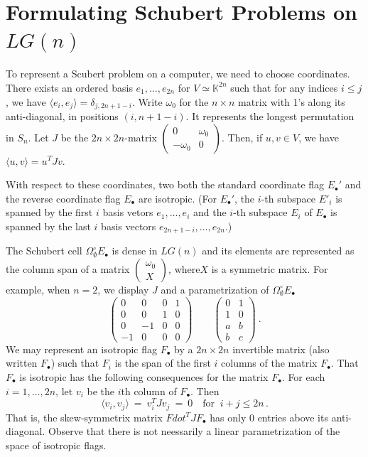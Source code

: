 \documentclass[12pt]{amsart}
\theoremstyle{remark}
\newcommand{\Fdot}{F_\bullet}
\newcommand{\Edot}{E_\bullet}
\newcommand{\LG}{\textit{LG}}
\newcommand{\KK}{{\mathbb K}}
\newcommand{\defcolor}[1]{{\color{blue}#1}}
\begin{document}
\section{Formulating Schubert Problems on $LG(n)$}

To represent a Scubert problem on a computer, we need to choose coordinates.
There exists an ordered basis  $e_1,\dotsc,e_{2n}$ for $V\simeq\KK^{2n}$ such that for any indices  $i\leq j$, we have 
$\langle e_i,e_j\rangle = \delta_{j, 2n+1-i}$.
Write \defcolor{$\omega_0$} for the $n\times n$ matrix with 1's along its anti-diagonal, in positions $(i,n{+}1{-}i)$.
It represents the longest permutation in $S_n$.
Let $J$ be the $2n\times 2n$-matrix $\left(\begin{smallmatrix}0&\omega_0\\-\omega_0&0\end{smallmatrix}\right)$.
Then, if $u,v\in V$, we have $\langle u,v\rangle = u^T J v$.

With respect to these coordinates, two both the standard coordinate flag $\Edot'$ and the reverse coordinate flag $\Edot$
are isotropic.
(For $\Edot'$, the $i$-th subspace $E'_i$ is spanned by the first $i$ basis vetors $e_1,\dotsc,e_i$ and
the  $i$-th subspace $E_i$ of $\Edot$ is spanned by the last $i$ basis vectors $e_{2n+1-i},\dotsc, e_{2n}$.)

The Schubert cell $\Omega^\circ_\emptyset \Edot$ is dense in $\LG(n)$ and its elements are represented as the column span of a matrix
$\left(\begin{smallmatrix}\omega_0\\X\end{smallmatrix}\right)$, where$X$ is a symmetric matrix.
For example, when $n=2$, we display $J$ and a parametrization of $\Omega^\circ_\emptyset \Edot$
\[
\left(\begin{matrix} 0& 0&0&1\\ 0& 0&1&0\\ 0&-1&0&0\\ -1& 0&0&0\end{matrix}\right)
  \qquad
  \left(\begin{matrix} 0&1\\ 1&0\\ a&b\\ b&c\end{matrix}\right)\ .
\]
We may represent an isotropic flag $\Fdot$ by a $2n\times 2n$ invertible matrix (also written $\Fdot$) such that $F_i$ is the span of
the first $i$ columns of the matrix $\Fdot$.
That $\Fdot$ is isotropic has the following consequences for the matrix $\Fdot$.
For each $i=1,\dotsc,2n$, let $v_i$ be the $i$th column of $\Fdot$.
Then
\[
\langle v_i, v_j\rangle \ =\ v_i^T J v_j\ =\ 0\quad\mbox{for }\ i+j\leq 2n\,.
\]
That is, the skew-symmetrix matrix $Fdot^T J \Fdot$ has only 0 entries above its anti-diagonal.
Observe that there is not neessarily a linear parametrization of the space of isotropic flags.
\end{document}
